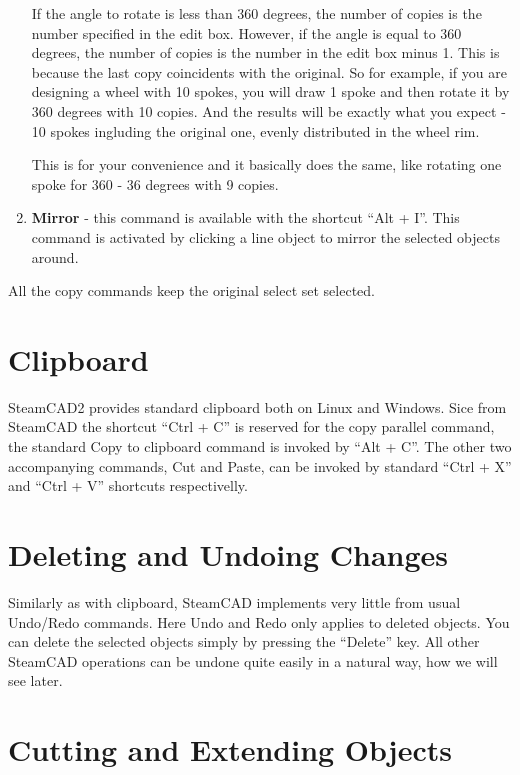 \begin{enumerate}
If the angle to rotate is less than 360 degrees, the number of copies is the number
specified in the edit box. However, if the angle is equal to 360 degrees, the number
of copies is the number in the edit box minus 1. This is because the last copy
coincidents with the original. So for example, if you are designing a wheel with
10 spokes, you will draw 1 spoke and then rotate it by 360 degrees with 10 copies.
And the results will be exactly what you expect - 10 spokes ingluding the original one,
evenly distributed in the wheel rim.

This is for your convenience and it basically does the same, like rotating one spoke
for 360 - 36 degrees with 9 copies.
\item \textbf{Mirror} - this command is available with the shortcut ``Alt + I''.
This command is activated by clicking a line object to mirror the selected objects
around.
\end{enumerate}

All the copy commands keep the original select set selected.

\section{Clipboard}

SteamCAD2 provides standard clipboard both on Linux and Windows. Sice from SteamCAD the
shortcut ``Ctrl + C'' is reserved for the copy parallel command, the standard Copy to
clipboard command is invoked by ``Alt + C''. The other two accompanying commands, Cut and
Paste, can be invoked by standard ``Ctrl + X'' and ``Ctrl + V'' shortcuts respectivelly.

\section{Deleting and Undoing Changes}

Similarly as with clipboard, SteamCAD implements very little from usual Undo/Redo
commands. Here Undo and Redo only applies to deleted objects. You can delete the selected
objects simply by pressing the ``Delete'' key. All other SteamCAD operations can be
undone quite easily in a natural way, how we will see later.

\section{Cutting and Extending Objects}

